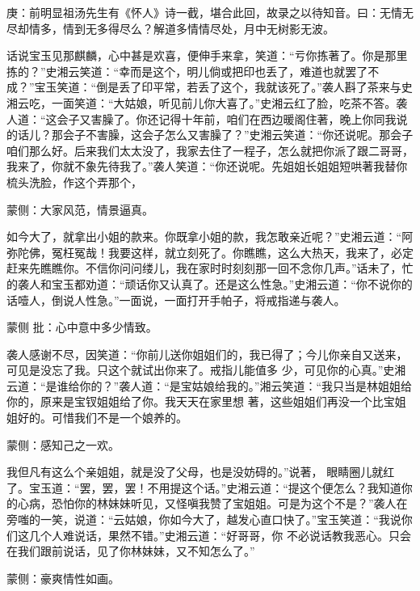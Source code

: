

\begin{parag}
    \begin{note}庚：前明显祖汤先生有《怀人》诗一截，堪合此回，故录之以待知音。曰：无情无尽却情多，情到无多得尽么？解道多情情尽处，月中无树影无波。\end{note}
\end{parag}


\begin{parag}
    话说宝玉见那麒麟，心中甚是欢喜，便伸手来拿，笑道：“亏你拣著了。你是那里拣的？”史湘云笑道：“幸而是这个，明儿倘或把印也丢了，难道也就罢了不 成？”宝玉笑道：“倒是丢了印平常，若丢了这个，我就该死了。”袭人斟了茶来与史湘云吃，一面笑道：“大姑娘，听见前儿你大喜了。”史湘云红了脸，吃茶不答。袭人道：“这会子又害臊了。你还记得十年前，咱们在西边暖阁住著，晚上你同我说的话儿？那会子不害臊，这会子怎么又害臊了？”史湘云笑道：“你还说呢。那会子咱们那么好。后来我们太太没了，我家去住了一程子，怎么就把你派了跟二哥哥，我来了，你就不象先待我了。”袭人笑道：“你还说呢。先姐姐长姐姐短哄著我替你梳头洗脸，作这个弄那个，\begin{note}蒙侧：大家风范，情景逼真。\end{note}如今大了，就拿出小姐的款来。你既拿小姐的款，我怎敢亲近呢？”史湘云道：“阿弥陀佛，冤枉冤哉！我要这样，就立刻死了。你瞧瞧，这么大热天，我来了，必定赶来先瞧瞧你。不信你问问缕儿，我在家时时刻刻那一回不念你几声。”话未了，忙的袭人和宝玉都劝道：“顽话你又认真了。还是这么性急。”史湘云道：“你不说你的话噎人，倒说人性急。”一面说，一面打开手帕子，将戒指递与袭人。\begin{note}蒙侧 批：心中意中多少情致。\end{note}袭人感谢不尽，因笑道：“你前儿送你姐姐们的，我已得了；今儿你亲自又送来，可见是没忘了我。只这个就试出你来了。戒指儿能值多 少，可见你的心真。”史湘云道：“是谁给你的？”袭人道：“是宝姑娘给我的。”湘云笑道：“我只当是林姐姐给你的，原来是宝钗姐姐给了你。我天天在家里想 著，这些姐姐们再没一个比宝姐姐好的。可惜我们不是一个娘养的。\begin{note}蒙侧：感知己之一欢。\end{note}我但凡有这么个亲姐姐，就是没了父母，也是没妨碍的。”说著， 眼睛圈儿就红了。宝玉道：“罢，罢，罢！不用提这个话。”史湘云道：“提这个便怎么？我知道你的心病，恐怕你的林妹妹听见，又怪嗔我赞了宝姐姐。可是为这个不是？”袭人在旁嗤的一笑，说道：“云姑娘，你如今大了，越发心直口快了。”宝玉笑道：“我说你们这几个人难说话，果然不错。”史湘云道：“好哥哥，你 不必说话教我恶心。只会在我们跟前说话，见了你林妹妹，又不知怎么了。”\begin{note}蒙侧：豪爽情性如画。\end{note}
\end{parag}


